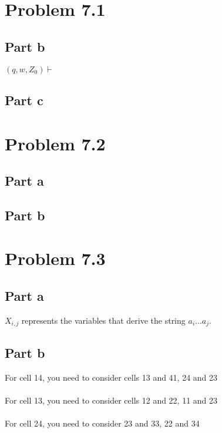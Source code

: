 \documentclass{article}%
\begin{document}
\section*{Problem 7.1}

\subsection*{Part b}

$(q, w, Z_0) \vdash $

\subsection*{Part c}

\section*{Problem 7.2}
\subsection*{Part a}

\subsection*{Part b}

\section*{Problem 7.3}
\subsection*{Part a}

$X_{i,j}$ represents the variables that derive the string $a_i...a_j$.

\subsection*{Part b}

For cell 14, you need to consider cells 13 and 41, 24 and 23\\
\\
For cell 13, you need to consider cells 12 and 22, 11 and 23\\
\\
For cell 24, you need to consider 23 and 33, 22 and 34\\
\\
\end{document}
